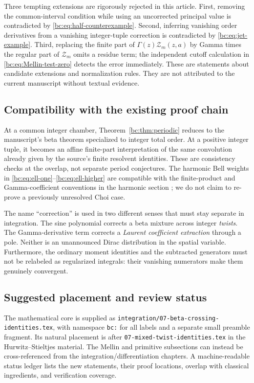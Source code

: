 \documentclass[11pt,letterpaper]{article}
\numberwithin{equation}{section}
\theoremstyle{definition}
\theoremstyle{remark}
\newcommand{\bcZ}{\mathcal Z}
\begin{document}
Three tempting extensions are rigorously rejected in this article.
First, removing the common-interval condition while using an uncorrected
principal value is contradicted by \eqref{bc:eq:half-counterexample}.
Second, inferring vanishing order derivatives from a vanishing
integer-tuple correction is contradicted by \eqref{bc:eq:jet-example}.
Third, replacing the finite part of $\Gamma(z)\bcZ_m(z,a)$ by Gamma times
the regular part of $\bcZ_m$ omits a residue term; the independent cutoff
calculation in \eqref{bc:eq:Mellin-test-zero} detects the error immediately.
These are statements about candidate extensions and normalization rules.
They are not attributed to the current manuscript without textual evidence.

\subsection{Compatibility with the existing proof chain}

At a common integer chamber, Theorem~\ref{bc:thm:periodic} reduces to the
manuscript's beta theorem specialized to integer total order. At a positive
integer tuple, it becomes an affine finite-part interpretation of the
same convolution already given by the source's finite resolvent
identities. These are consistency checks at the overlap, not separate
period conjectures. The harmonic Bell weights in
\eqref{bc:eq:ell-one}--\eqref{bc:eq:ell-higher} are compatible with the
finite-product and Gamma-coefficient conventions in the harmonic
section \cite{repo-harmonic}; we do not claim to re-prove a previously
unresolved Choi case.

The name ``correction'' is used in two different senses that must stay
separate in integration. The sine polynomial corrects a beta mixture
across integer \emph{twists}. The Gamma-derivative term corrects a
\emph{Laurent coefficient extraction} through a pole. Neither is an
unannounced Dirac distribution in the spatial variable. Furthermore,
the ordinary moment identities and the subtracted generators must not
be relabeled as regularized integrals: their vanishing numerators make
them genuinely convergent.

\subsection{Suggested placement and review status}

The mathematical core is supplied as
\texttt{integration/07-beta-crossing-identities.tex}, with namespace
\texttt{bc:} for all labels and a separate small preamble fragment.
Its natural placement is after
\texttt{07-mixed-twist-identities.tex} in the Hurwitz--Stieltjes material.
The Mellin and primitive subsections can instead be cross-referenced
from the integration/differentiation chapters. A machine-readable status
ledger lists the new statements, their proof locations, overlap with
classical ingredients, and verification coverage.
\end{document}
